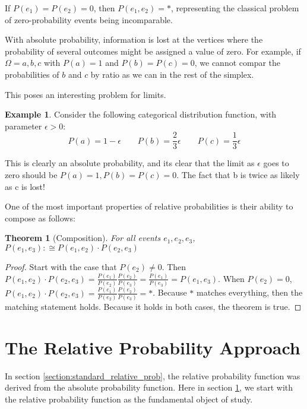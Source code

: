 \documentclass[twoside]{article}
\theoremstyle{plain}%
\newtheorem{theorem}{Theorem}[section]
\theoremstyle{definition}
\newtheorem{example}{Example}[section]
\theoremstyle{remark}
\begin{document}
If \(P(e_1) = P(e_2) = 0\), then \(P(e_1, e_2) = \ast\), representing the classical problem of zero-probability events being incomparable.

With absolute probability, information is lost at the vertices where the probability of several outcomes might be assigned a value of zero. For example, if \(\Omega = {a, b, c}\) with \(P(a) = 1\) and \(P(b) = P(c) = 0\), we cannot compar the probabilities of \(b\) and \(c\) by ratio as we can in the rest of the simplex.

This poses an interesting problem for limits.

\begin{example}
\label{ex:abs_lose_info}
Consider the following categorical distribution function, with parameter \(\epsilon > 0\):
\[
P(a) = 1 - \epsilon\qquad
P(b) = \frac{2}{3}\epsilon\qquad
P(c) = \frac{1}{3}\epsilon
\]
\end{example}

This is clearly an absolute probability, and its clear that the limit as \(\epsilon\) goes to zero should be \(P(a) = 1, P(b) = P(c) = 0\). The fact that b is twice as likely as c is lost!

One of the most important properties of relative probabilities is their ability to compose as follows:

\begin{theorem}[Composition]
\label{thm:abs_composition}
For all events \(e_1, e_2, e_3\), \(P(e_1, e_3) :\cong P(e_1, e_2) \cdot P(e_2, e_3)\)
\end{theorem}

\begin{proof}
Start with the case that \(P(e_2)\neq 0\). Then \(P(e_1, e_2) \cdot P(e_2, e_3) = \frac{P(e_1)}{P(e_2)}\frac{P(e_2)}{P(e_3)} = \frac{P(e_1)}{P(e_3)} = P(e_1, e_3)\). When \(P(e_2) = 0\), \(P(e_1, e_2) \cdot P(e_2, e_3) = \frac{P(e_1)}{P(e_2)}\frac{P(e_2)}{P(e_3)} = \ast\). Because \(\ast\) matches everything, then the matching statement holds. Because it holds in both cases, the theorem is true.
\end{proof}

\section{The Relative Probability Approach}
\label{section:new_relative_prob}

In section \ref{section:standard_relative_prob}, the relative probability function was derived from the absolute probability function. Here in section \ref{section:new_relative_prob}, we start with the relative probability function as the fundamental object of study.
\end{document}
